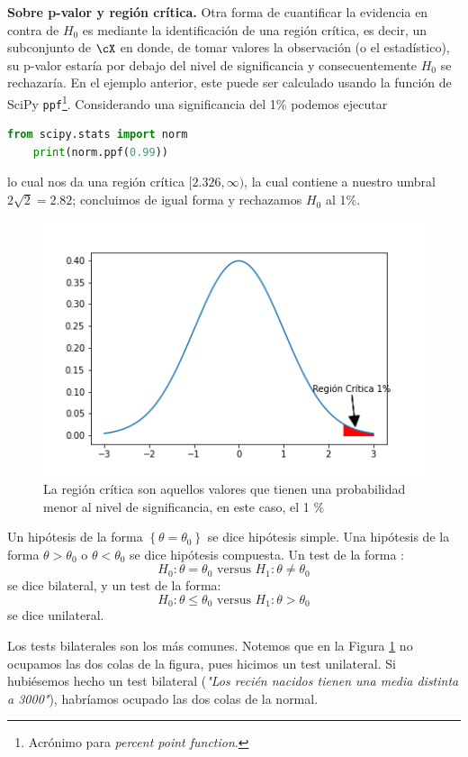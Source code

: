 \textbf{Sobre p-valor y región crítica.}
Otra forma de cuantificar la evidencia en contra de $H_0$ es mediante la identificación de una región crítica, es decir, un subconjunto de $\cX$ en donde, de tomar valores la observación (o el estadístico), su p-valor estaría por debajo del nivel de significancia y consecuentemente $H_0$ se rechazaría. En el ejemplo anterior, este puede ser calculado usando la función de SciPy \texttt{ppf}\footnote{Acrónimo para \emph{percent point function}.}. Considerando una significancia del 1\% podemos ejecutar
\begin{lstlisting}[language=Python]
	from scipy.stats import norm
	print(norm.ppf(0.99))
\end{lstlisting}
lo cual nos da una región crítica $[2.326,\infty)$, la cual contiene a nuestro umbral $2\sqrt{2} = 2.82$; concluimos de igual forma y rechazamos $H_0$ al 1\%. 

\begin{figure}[ht]
    \centering
    \includegraphics[scale=0.7]{img/Region_critica.png}
    \caption{La región crítica son aquellos valores que tienen una probabilidad menor al nivel de significancia, en este caso, el 1 $\%$}
    \label{fig:region_critica}
\end{figure}
\begin{remark}
Un hipótesis de la forma $\left \{ \theta=\theta_0\right \}$ se dice hipótesis simple. Una hipótesis de la forma $\theta > \theta_0$ o $\theta < \theta_0$ se dice hipótesis compuesta. Un test de la forma :
 $$
 H_0: \theta=\theta_0 \text{ versus } H_1:\theta \not = \theta_0
 $$
se dice bilateral, y un test de la forma: 
$$
H_0: \theta \leq \theta_0 \text{ versus } H_1:\theta > \theta_0
$$
se dice unilateral. 

Los tests bilaterales son los más comunes.  Notemos que en la Figura \ref{fig:region_critica} no ocupamos las dos colas de la figura, pues hicimos un test unilateral. Si hubiésemos hecho un test bilateral (\emph{"Los recién nacidos tienen una media distinta a 3000"}), habríamos ocupado las dos colas de la normal. 
\end{remark}

